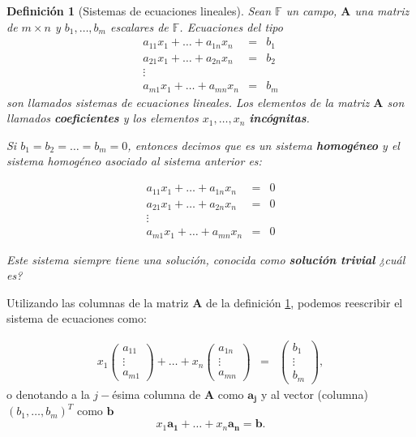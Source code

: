 \documentclass[11pt]{report}
\theoremstyle{break}
\newtheorem{definicion}{Definición}[chapter]
\theoremstyle{break}
\newcommand{\mbb}[1]{$\mathbb{#1}$}
\newcommand{\matdim}[2]{$#1 \times #2$}
\begin{document}
\begin{definicion}[Sistemas de ecuaciones lineales]
\label{definicion:sistema-ecuaciones-lineales}
Sean \mbb{F} un campo, $\bm{A}$ una matriz de \matdim{m}{n} y $b_1, \ldots, b_m$ escalares de \mbb{F}. Ecuaciones del tipo
$$
\begin{array}{rcl}
a_{11}x_1 + \ldots + a_{1n}x_n & = & b_1 \\
a_{21}x_1 + \ldots + a_{2n}x_n & = & b_2 \\
\vdots &  &  \\
a_{m1}x_1 + \ldots + a_{mn}x_n & = & b_m
\end{array}
$$
son llamados sistemas de ecuaciones lineales. Los elementos de la matriz $\bm{A}$ son llamados \textbf{coeficientes} y los elementos $x_1, \ldots, x_n$ \textbf{incógnitas}.

Si $b_1 = b_2 = \ldots = b_m = 0$, entonces decimos que es un sistema \textbf{homogéneo} y el sistema homogéneo asociado al sistema anterior es:

$$
\begin{array}{rcl}
a_{11}x_1 + \ldots + a_{1n}x_n & = & 0 \\
a_{21}x_1 + \ldots + a_{2n}x_n & = & 0 \\
\vdots &  &  \\
a_{m1}x_1 + \ldots + a_{mn}x_n & = & 0
\end{array}
$$

Este sistema siempre tiene una solución, conocida como \textbf{solución trivial} ¿cuál es?
\end{definicion}

Utilizando las columnas de la matriz $\bm{A}$ de la definición \ref{definicion:sistema-ecuaciones-lineales}, podemos reescribir el sistema de ecuaciones como:

$$
\begin{array}{crl}
x_1
\begin{pmatrix}
a_{11} \\
\vdots \\
a_{m1}
\end{pmatrix}
+ \ldots + 
x_n
\begin{pmatrix}
a_{1n} \\
\vdots \\
a_{mn}
\end{pmatrix}
& = & 
\begin{pmatrix}
b_1 \\
\vdots \\
b_m
\end{pmatrix},
\end{array}
$$
o denotando a la $j-$ésima columna de $\bm{A}$ como $\bm{a_{j}}$ y al vector (columna) $(b_1, \ldots, b_m)^{T}$ como $\bm{b}$
$$ x_1\bm{a_{1}} + \ldots + x_n \bm{a_{n}} = \bm{b}.$$
\end{document}
